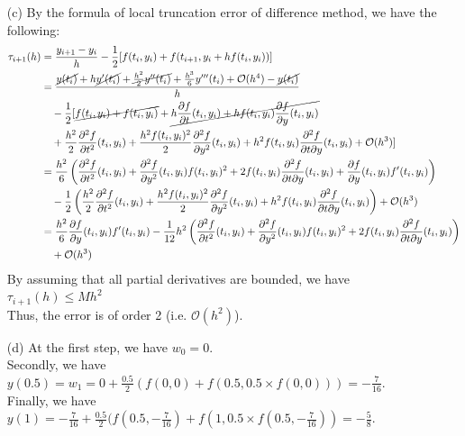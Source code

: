 \documentclass[11pt]{article}
\begin{document}
\begin{itemize}
	\item [(c)]
	By the formula of local truncation error of difference method, we have the following:
	\begin{equation*}
	\begin{aligned}
	\tau_{i+1}(h) &= \frac{y_{i+1}-y_i}{h} - \frac{1}{2}[f(t_i,y_i) + f(t_{i+1},y_i+hf(t_i,y_i))]\\
	&=\frac{ \cancel{y(t_i)} + h\cancel{y'(t_i) }+ \cancel{\frac{h^2}{2}y''(t_i)} + \frac{h^3}{6}y'''(t_i) + \mathcal{O}(h^4)- \cancel{y(t_i)}}{h}\\
	&\quad-\frac{1}{2}[\cancel{f(t_i,y_i) + f(t_i,y_i)} + \cancel{h\frac{\partial f}{\partial t}(t_i,y_i) + hf(t_i,y_i)\frac{\partial f}{\partial y}(t_i,y_i)}\\
	&\quad+\frac{h^2}{2}\frac{\partial^2 f}{\partial t^2}(t_i,y_i) + \frac{h^2f(t_i,y_i)^2}{2}\frac{\partial^2 f}{\partial y^2}(t_i,y_i)+h^2f(t_i,y_i)\frac{\partial^2 f}{\partial t\partial y}(t_i,y_i) + \mathcal{O}(h^3) ]\\
	&= \frac{h^2}{6} \left(\frac{\partial^2 f}{\partial t^2}(t_i,y_i) + \frac{\partial^2 f}{\partial y^2}(t_i,y_i)f(t_i,y_i)^2 + 2f(t_i,y_i)\frac{\partial^2 f}{\partial t\partial y}(t_i,y_i) + \frac{\partial f}{\partial y}(t_i,y_i)f'(t_i,y_i) \right)\\
	&\quad- \frac{1}{2}\left( \frac{h^2}{2}\frac{\partial^2 f}{\partial t^2}(t_i,y_i) + \frac{h^2f(t_i,y_i)^2}{2}\frac{\partial^2 f}{\partial y^2}(t_i,y_i)+h^2f(t_i,y_i)\frac{\partial^2 f}{\partial t\partial y}(t_i,y_i) \right) + \mathcal{O}(h^3)\\
	&=\frac{h^2}{6}\frac{\partial f}{\partial y}(t_i,y_i)f'(t_i,y_i) - \frac{1}{12}h^2\left( \frac{\partial^2 f}{\partial t^2}(t_i,y_i) + \frac{\partial^2 f}{\partial y^2}(t_i,y_i)f(t_i,y_i)^2 + 2f(t_i,y_i)\frac{\partial^2 f}{\partial t\partial y}(t_i,y_i)  \right)\\
	&\quad+ \mathcal{O}(h^3)
	\end{aligned}
	\end{equation*}
	By assuming that all partial derivatives are bounded, we have $ \tau_{i+1}(h) \le Mh^2 $\\
	Thus, the error is of order 2 (i.e. $ \mathcal{O}(h^2) $).
	\item [(d)]
	At the first step, we have $ w_0 = 0 $.\\
	Secondly, we have $\displaystyle y(0.5) = w_1 = 0 + \frac{0.5}{2}(f(0,0) + f(0.5,0.5\times f(0,0) ))  = -\frac{7}{16}$.\\
	Finally, we have $\displaystyle y(1) = -\frac{7}{16} + \frac{0.5}{2}(f(0.5,-\frac{7}{16}) + f(1,0.5\times f(0.5,-\frac{7}{16})) = \boxed{-\frac{5}{8}}$.
	
\end{itemize}
\end{document}
